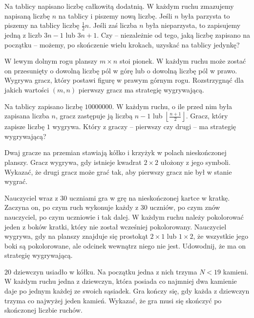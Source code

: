 \begin{problem}{1}
	Na tablicy napisano liczbę całkowitą dodatnią. W każdym ruchu zmazujemy napisaną liczbę $n$ na tablicy i piszemy nową liczbę. Jeśli $n$ była parzysta to piszemy na tablicy liczbę $\frac{1}{2}n$. Jeśli zaś liczba $n$ była nieparzysta, to zapisujemy jedną z liczb $3n - 1$ lub $3n + 1$. Czy -- niezależnie od tego, jaką liczbę zapisano na początku -- możemy, po skończenie wielu krokach, uzyskać na tablicy jedynkę?
\end{problem}


\begin{problem}{2}
	W lewym dolnym rogu planszy $m \times n$ stoi pionek. W każdym ruchu może zostać on przesunięty o dowolną liczbę pól w górę lub o dowolną liczbę pól w prawo. Wygrywa gracz, który postawi figurę w prawym górnym rogu. Rozstrzygnąć dla jakich wartości $(m, n)$ pierwszy gracz ma strategię wygrywającą.
\end{problem}

\begin{problem}{3}
	Na tablicy zapisano liczbę $10000000$. W każdym ruchu, o ile przed nim była zapisana liczba $n$, gracz zastępuje ją liczbą $n - 1$ lub $\left\lfloor\frac{n + 1}{2}\right\rfloor$. Gracz, który zapisze liczbę $1$ wygrywa. Który z graczy – pierwszy czy drugi – ma strategię wygrywającą?
\end{problem}

\begin{problem}{4}
	Dwaj gracze na przemian stawiają kółko i krzyżyk w polach nieskończonej planszy. Gracz wygrywa, gdy istnieje kwadrat $2\times2$ ułożony z jego symboli. Wykazać, że drugi gracz może grać tak, aby pierwszy gracz nie był w stanie wygrać.
\end{problem}

\begin{problem}{5}
	Nauczyciel wraz z 30 uczniami gra w grę na nieskończonej kartce w kratkę. Zaczyna on, po czym ruch wykonuje każdy z 30 uczniów, po czym znów nauczyciel, po czym uczniowie i tak dalej. W każdym ruchu należy pokolorować jeden z boków kratki, który nie został wcześniej pokolorowany. Nauczyciel wygrywa, gdy na planszy znajduje się prostokąt $2 \times 1$ lub $1 \times 2$, że wszystkie jego boki są pokolorowane, ale odcinek wewnątrz niego nie jest. Udowodnij, że ma on strategię wygrywającą.
\end{problem}

\begin{problem}{6}
	$20$ dziewczyn usiadło w kółku. Na początku jedna z nich trzyma $N < 19$ kamieni. W każdym ruchu jedna z dziewczyn, która posiada co najmniej dwa kamienie daje po jednym każdej ze swoich sąsiadek. Gra kończy się, gdy każda z dziewczyn trzyma co najwyżej jeden kamień. Wykazać, że gra musi się skończyć po skończonej liczbie ruchów.
\end{problem}